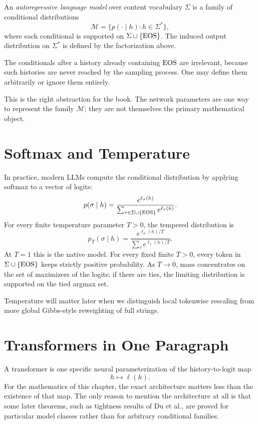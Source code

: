 \begin{definition}
An \emph{autoregressive language model} over content vocabulary $\Sigma$ is a family of conditional distributions
\[
  \mathcal{M} = \{p(\cdot \mid h)
  : h \in \Sigma^*\},
\]
where each conditional is supported on $\Sigma \cup \{\operatorname{EOS}\}$. The induced output distribution on $\Sigma^*$ is defined by the factorization above.
\end{definition}

The conditionals after a history already containing $\operatorname{EOS}$ are irrelevant, because such histories are never reached by the sampling process. One may define them arbitrarily or ignore them entirely.

This is the right abstraction for the book. The network parameters are one way to represent the family $\mathcal M$; they are not themselves the primary mathematical object.

\section{Softmax and Temperature}

In practice, modern LLMs compute the conditional distribution by applying softmax to a vector of logits:
\[
  p(\sigma \mid h) = \frac{e^{\ell_\sigma(h)}}{\sum_{\tau \in \Sigma \cup \{\operatorname{EOS}\}} e^{\ell_\tau(h)}}.
\]
For every finite temperature parameter $T>0$, the tempered distribution is
\[
  p_T(\sigma \mid h) = \frac{e^{\ell_\sigma(h)/T}}{\sum_{\tau} e^{\ell_\tau(h)/T}}.
\]
At $T=1$ this is the native model. For every fixed finite $T>0$, every token in $\Sigma \cup \{\operatorname{EOS}\}$ keeps strictly positive probability. As $T \to 0$, mass concentrates on the set of maximizers of the logits; if there are ties, the limiting distribution is supported on the tied argmax set.

Temperature will matter later when we distinguish local tokenwise rescaling from more global Gibbs-style reweighting of full strings.

\section{Transformers in One Paragraph}

A transformer is one specific neural parameterization of the history-to-logit map
\[
  h \longmapsto \ell(h).
\]
For the mathematics of this chapter, the exact architecture matters less than the existence of that map. The only reason to mention the architecture at all is that some later theorems, such as tightness results of Du et al., are proved for particular model classes rather than for arbitrary conditional families.

